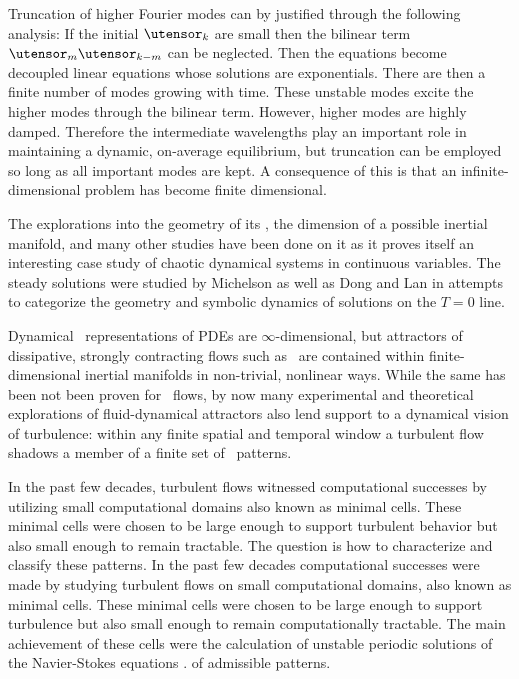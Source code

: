 Truncation of higher Fourier modes can by justified through the following
analysis: If the initial $\utensor_k$ are small then the bilinear term $\utensor_m
\utensor_{k-m}$ can be neglected. Then the equations become decoupled linear
equations whose solutions are exponentials. There are then a finite
number of modes growing with time. These unstable modes excite the higher
modes through the bilinear term. However, higher modes are highly damped.
Therefore the intermediate wavelengths play an important role in
maintaining a dynamic, on-average equilibrium, but truncation can be
employed so long as all important modes are kept. A consequence of this
is that an infinite-dimensional problem has become finite dimensional.

The explorations into the geometry of its {\statesp}, the
dimension of a possible inertial manifold, and many other
studies have been done on it as it proves itself an interesting case
study of chaotic dynamical systems in continuous variables. The steady
solutions were studied by Michelson as well as Dong and
Lan in attempts to categorize the geometry and symbolic
dynamics of solutions on the $T=0$ line.

Dynamical \statesp\ representations of PDEs are $\infty$-dimensional, but
attractors of dissipative, strongly contracting flows such as \KS\ are
contained within finite-dimensional inertial manifolds%
 in non-trivial, nonlinear ways. While the same has been
not been proven for \NS\ flows, by now many
experimental and theoretical explorations of fluid-dynamical attractors
also lend support to a dynamical vision of turbulence: within any finite spatial
and temporal window a turbulent flow shadows a member of a finite set
of \spt\ patterns.

In the past few decades, turbulent flows witnessed computational successes
by utilizing small computational domains also known as minimal cells.
These minimal cells were chosen to be large
enough to support turbulent behavior but also small enough to
remain tractable.
The question is how to characterize and classify these patterns.
In the past few decades computational successes were made
by studying turbulent flows on small computational domains, also known as minimal cells.
These minimal cells
were chosen to be large
enough to support turbulence but also small enough to
remain computationally tractable.
The main achievement of these cells
were the calculation of unstable periodic solutions of the
Navier-Stokes equations . %
of admissible patterns.

